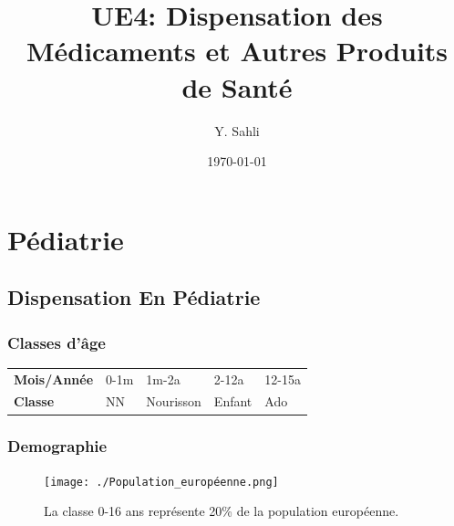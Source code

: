 \documentclass[11pt]{article}
\author{Y. Sahli}
\date{\today}
\title{UE4: Dispensation des Médicaments et Autres Produits de Santé}
\begin{document}
\maketitle
\tableofcontents

\setlength{\parindent}{0pt}
\section{Pédiatrie}
\label{sec:orgc48c6c3}
\setlength{\parindent}{0pt}
\subsection{Dispensation En Pédiatrie}
\label{sec:orgc717882}
\subsubsection{Classes d'âge}
\label{sec:org868a204}
\begin{center}
\begin{tabular}{lllll}
\textbf{Mois/Année} & 0-1m & 1m-2a & 2-12a & 12-15a\\
\textbf{Classe} & NN\footnotemark & Nourisson & Enfant & Ado\\
\end{tabular}
\end{center}
\subsubsection{Demographie}
\label{sec:org422dcd8}
\begin{figure}[htbp]
\centering
\texttt{[image: ./Population\_européenne.png]}
\caption{La classe 0-16 ans représente 20\% de la population européenne.}
\end{figure}
\end{document}
